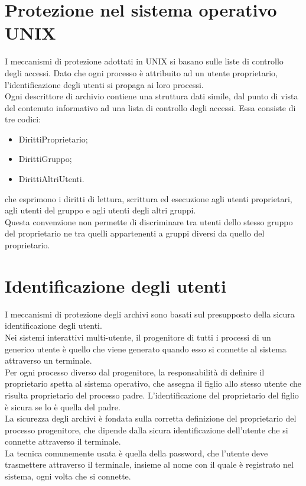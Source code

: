 \documentclass[12pt, letterpaper]{report}
\begin{document}
	\section{Protezione nel sistema operativo UNIX}
	I meccanismi di protezione adottati in UNIX si basano sulle liste di controllo degli accessi. Dato che ogni processo è attribuito ad un utente proprietario, l'identificazione degli utenti si propaga ai loro processi. \\
	Ogni descrittore di archivio contiene una struttura dati simile, dal punto di vista del contenuto informativo ad una lista di controllo degli accessi. Essa consiste di tre codici:
	\begin{itemize}
		\item DirittiProprietario;
		\item DirittiGruppo;
		\item DirittiAltriUtenti.
	\end{itemize}
	che esprimono i diritti di lettura, scrittura ed esecuzione agli utenti proprietari, agli utenti del gruppo e agli utenti degli altri gruppi. \\
	Questa convenzione non permette di discriminare tra utenti dello stesso gruppo del proprietario ne tra quelli appartenenti a gruppi diversi da quello del proprietario. \\
	\section{Identificazione degli utenti}
	I meccanismi di protezione degli archivi sono basati sul presupposto della sicura identificazione degli utenti. \\
	Nei sistemi interattivi multi-utente, il progenitore di tutti i processi di un generico utente è quello che viene generato quando esso si connette al sistema attraverso un terminale. \\
	Per ogni processo diverso dal progenitore, la responsabilità di definire il proprietario spetta al sistema operativo, che assegna il figlio allo stesso utente che risulta proprietario del processo padre. L'identificazione del proprietario del figlio è sicura se lo è quella del padre. \\
	La sicurezza degli archivi è fondata sulla corretta definizione del proprietario del processo progenitore, che dipende dalla sicura identificazione dell'utente che si connette attraverso il terminale. \\
	La tecnica comunemente usata è quella della password, che l'utente deve trasmettere attraverso il terminale, insieme al nome con il quale è registrato nel sistema, ogni volta che si connette.
\end{document}
